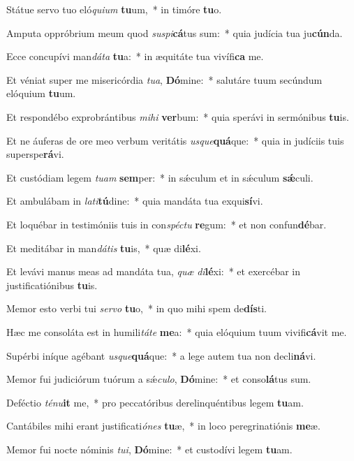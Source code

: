 \item Státue servo tuo eló\textit{qui}\textit{um} \textbf{tu}um,~* in timóre \textbf{tu}o.
\item Amputa oppróbrium meum quod \textit{su}\textit{spi}\textbf{cá}tus sum:~* quia judícia tua ju\textbf{cún}da.
\item Ecce concupívi man\textit{dá}\textit{ta} \textbf{tu}a:~* in æquitáte tua vivífi\textbf{ca} me.
\item Et véniat super me misericórdia \textit{tu}\textit{a}, \textbf{Dó}mine:~* salutáre tuum secúndum elóquium \textbf{tu}um.
\item Et respondébo exprobrántibus \textit{mi}\textit{hi} \textbf{ver}bum:~* quia sperávi in sermónibus \textbf{tu}is.
\item Et ne áuferas de ore meo verbum veritátis \textit{us}\textit{que}\textbf{quá}que:~* quia in judíciis tuis superspe\textbf{rá}vi.
\item Et custódiam legem \textit{tu}\textit{am} \textbf{sem}per:~* in sǽculum et in sǽculum \textbf{sǽ}culi.
\item Et ambulábam in \textit{la}\textit{ti}\textbf{tú}dine:~* quia mandáta tua exqui\textbf{sí}vi.
\item Et loquébar in testimóniis tuis in con\textit{spéc}\textit{tu} \textbf{re}gum:~* et non confun\textbf{dé}bar.
\item Et meditábar in man\textit{dá}\textit{tis} \textbf{tu}is,~* quæ di\textbf{lé}xi.
\item Et levávi manus meas ad mandáta tua, \textit{quæ} \textit{di}\textbf{lé}xi:~* et exercébar in justificatiónibus \textbf{tu}is.
\item Memor esto verbi tui \textit{ser}\textit{vo} \textbf{tu}o,~* in quo mihi spem de\textbf{dís}ti.
\item Hæc me consoláta est in humili\textit{tá}\textit{te} \textbf{me}a:~* quia elóquium tuum vivifi\textbf{cá}vit me.
\item Supérbi iníque agébant \textit{us}\textit{que}\textbf{quá}que:~* a lege autem tua non decli\textbf{ná}vi.
\item Memor fui judiciórum tuórum a sǽ\textit{cu}\textit{lo}, \textbf{Dó}mine:~* et conso\textbf{lá}tus sum.
\item Deféctio \textit{té}\textit{nu}\textbf{it} me,~* pro peccatóribus derelinquéntibus legem \textbf{tu}am.
\item Cantábiles mihi erant justificati\textit{ó}\textit{nes} \textbf{tu}æ,~* in loco peregrinatiónis \textbf{me}æ.
\item Memor fui nocte nóminis \textit{tu}\textit{i}, \textbf{Dó}mine:~* et custodívi legem \textbf{tu}am.
